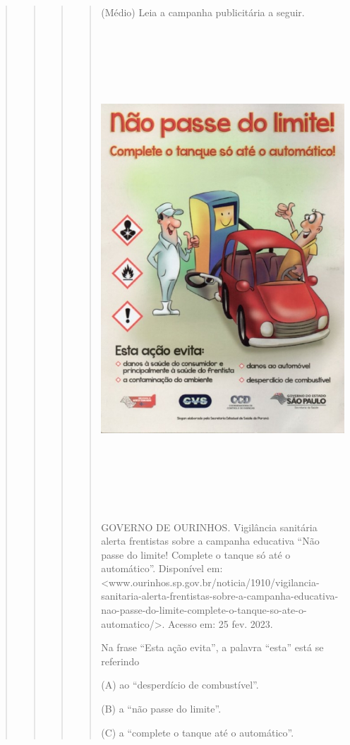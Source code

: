 \begin{quote}
\begin{quote}
\begin{quote}
\begin{quote}
(Médio) Leia a campanha publicitária a seguir.

\includegraphics[width=5.20833in,height=7.05556in]{media/image35.jpeg}

GOVERNO DE OURINHOS. Vigilância sanitária alerta frentistas sobre a
campanha educativa ``Não passe do limite! Complete o tanque só até o
automático''. Disponível em:
\textless{}www.ourinhos.sp.gov.br/noticia/1910/vigilancia-sanitaria-alerta-frentistas-sobre-a-campanha-educativa-nao-passe-do-limite-complete-o-tanque-so-ate-o-automatico/\textgreater{}.
Acesso em: 25 fev. 2023.

Na frase ``Esta ação evita'', a palavra ``esta'' está se referindo

(A) ao ``desperdício de combustível''.

(B) a ``não passe do limite''.

(C) a ``complete o tanque até o automático''.


\end{quote}
\end{quote}
\end{quote}
\end{quote}
